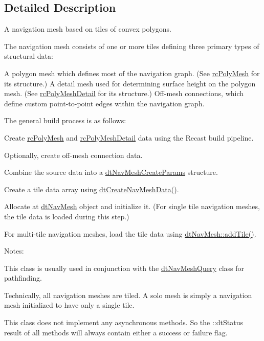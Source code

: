 \subsection{Detailed Description}
A navigation mesh based on tiles of convex polygons.

The navigation mesh consists of one or more tiles defining three primary types of structural data\+:

A polygon mesh which defines most of the navigation graph. (See \hyperlink{structrcPolyMesh}{rc\+Poly\+Mesh} for its structure.) A detail mesh used for determining surface height on the polygon mesh. (See \hyperlink{structrcPolyMeshDetail}{rc\+Poly\+Mesh\+Detail} for its structure.) Off-\/mesh connections, which define custom point-\/to-\/point edges within the navigation graph.

The general build process is as follows\+:


\begin{DoxyEnumerate}
\item Create \hyperlink{structrcPolyMesh}{rc\+Poly\+Mesh} and \hyperlink{structrcPolyMeshDetail}{rc\+Poly\+Mesh\+Detail} data using the Recast build pipeline.
\item Optionally, create off-\/mesh connection data.
\item Combine the source data into a \hyperlink{structdtNavMeshCreateParams}{dt\+Nav\+Mesh\+Create\+Params} structure.
\item Create a tile data array using \hyperlink{group__detour_gaf56ac19e79e5948fdb1051158577e648}{dt\+Create\+Nav\+Mesh\+Data()}.
\item Allocate at \hyperlink{classdtNavMesh}{dt\+Nav\+Mesh} object and initialize it. (For single tile navigation meshes, the tile data is loaded during this step.)
\item For multi-\/tile navigation meshes, load the tile data using \hyperlink{classdtNavMesh_a5b5a7c4fa72c08d9a6d4cc4d8cd3bb89}{dt\+Nav\+Mesh\+::add\+Tile()}.
\end{DoxyEnumerate}

Notes\+:


\begin{DoxyItemize}
\item This class is usually used in conjunction with the \hyperlink{classdtNavMeshQuery}{dt\+Nav\+Mesh\+Query} class for pathfinding.
\item Technically, all navigation meshes are tiled. A \textquotesingle{}solo\textquotesingle{} mesh is simply a navigation mesh initialized to have only a single tile.
\item This class does not implement any asynchronous methods. So the \+::dt\+Status result of all methods will always contain either a success or failure flag.
\end{DoxyItemize}

